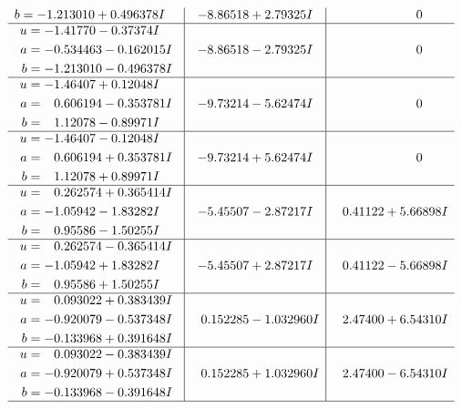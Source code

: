 \documentclass[1p]{elsarticle_modified}
\theoremstyle{definition}
\begin{document}
$$\begin{array}{c|c|c}
\begin{aligned}
b &= -1.213010 + 0.496378 I\end{aligned}
 & -8.86518 + 2.79325 I & \phantom{-0.000000 } 0 \\ \hline\begin{aligned}
u &= -1.41770 - 0.37374 I \\
a &= -0.534463 - 0.162015 I \\
b &= -1.213010 - 0.496378 I\end{aligned}
 & -8.86518 - 2.79325 I & \phantom{-0.000000 } 0 \\ \hline\begin{aligned}
u &= -1.46407 + 0.12048 I \\
a &= \phantom{-}0.606194 - 0.353781 I \\
b &= \phantom{-}1.12078 - 0.89971 I\end{aligned}
 & -9.73214 - 5.62474 I & \phantom{-0.000000 } 0 \\ \hline\begin{aligned}
u &= -1.46407 - 0.12048 I \\
a &= \phantom{-}0.606194 + 0.353781 I \\
b &= \phantom{-}1.12078 + 0.89971 I\end{aligned}
 & -9.73214 + 5.62474 I & \phantom{-0.000000 } 0 \\ \hline\begin{aligned}
u &= \phantom{-}0.262574 + 0.365414 I \\
a &= -1.05942 - 1.83282 I \\
b &= \phantom{-}0.95586 - 1.50255 I\end{aligned}
 & -5.45507 - 2.87217 I & \phantom{-}0.41122 + 5.66898 I \\ \hline\begin{aligned}
u &= \phantom{-}0.262574 - 0.365414 I \\
a &= -1.05942 + 1.83282 I \\
b &= \phantom{-}0.95586 + 1.50255 I\end{aligned}
 & -5.45507 + 2.87217 I & \phantom{-}0.41122 - 5.66898 I \\ \hline\begin{aligned}
u &= \phantom{-}0.093022 + 0.383439 I \\
a &= -0.920079 - 0.537348 I \\
b &= -0.133968 + 0.391648 I\end{aligned}
 & \phantom{-}0.152285 - 1.032960 I & \phantom{-}2.47400 + 6.54310 I \\ \hline\begin{aligned}
u &= \phantom{-}0.093022 - 0.383439 I \\
a &= -0.920079 + 0.537348 I \\
b &= -0.133968 - 0.391648 I\end{aligned}
 & \phantom{-}0.152285 + 1.032960 I & \phantom{-}2.47400 - 6.54310 I\\
 \hline 
 \end{array}$$\newpage\newpage\renewcommand{\arraystretch}{1}
\end{document}
